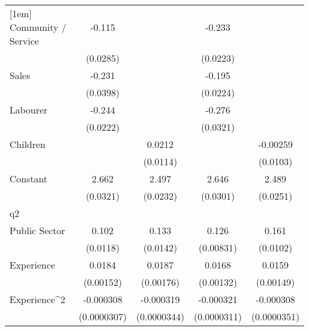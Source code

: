 {\begin{tabular}{l*{4}{c}}
[1em]
Community / Service &      -0.115\sym{***}&                     &      -0.233\sym{***}&                     \\
                    &    (0.0285)         &                     &    (0.0223)         &                     \\
[1em]
Sales               &      -0.231\sym{***}&                     &      -0.195\sym{***}&                     \\
                    &    (0.0398)         &                     &    (0.0224)         &                     \\
[1em]
Labourer            &      -0.244\sym{***}&                     &      -0.276\sym{***}&                     \\
                    &    (0.0222)         &                     &    (0.0321)         &                     \\
[1em]
Children            &                     &      0.0212         &                     &    -0.00259         \\
                    &                     &    (0.0114)         &                     &    (0.0103)         \\
[1em]
Constant            &       2.662\sym{***}&       2.497\sym{***}&       2.646\sym{***}&       2.489\sym{***}\\
                    &    (0.0321)         &    (0.0232)         &    (0.0301)         &    (0.0251)         \\
\hline
q2                  &                     &                     &                     &                     \\
Public Sector       &       0.102\sym{***}&       0.133\sym{***}&       0.126\sym{***}&       0.161\sym{***}\\
                    &    (0.0118)         &    (0.0142)         &   (0.00831)         &    (0.0102)         \\
[1em]
Experience          &      0.0184\sym{***}&      0.0187\sym{***}&      0.0168\sym{***}&      0.0159\sym{***}\\
                    &   (0.00152)         &   (0.00176)         &   (0.00132)         &   (0.00149)         \\
[1em]
Experience^{2}      &   -0.000308\sym{***}&   -0.000319\sym{***}&   -0.000321\sym{***}&   -0.000308\sym{***}\\
                    & (0.0000307)         & (0.0000344)         & (0.0000311)         & (0.0000351)         \\

\end{tabular}}
